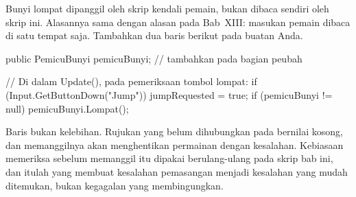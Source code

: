 
Bunyi lompat dipanggil oleh skrip kendali pemain, bukan dibaca sendiri oleh
skrip ini. Alasannya sama dengan alasan pada Bab~XIII: masukan pemain dibaca di
satu tempat saja. Tambahkan dua baris berikut pada 
buatan Anda.

\begin{kodekeluaran}
public PemicuBunyi pemicuBunyi;          // tambahkan pada bagian peubah

// Di dalam Update(), pada pemeriksaan tombol lompat:
if (Input.GetButtonDown("Jump"))
{
    jumpRequested = true;
    if (pemicuBunyi != null) pemicuBunyi.Lompat();
}
\end{kodekeluaran}

\begin{catatabox}
Baris  bukan kelebihan. Rujukan yang belum
dihubungkan pada  bernilai kosong, dan memanggilnya akan
menghentikan permainan dengan kesalahan. Kebiasaan memeriksa sebelum memanggil
itu dipakai berulang-ulang pada skrip bab ini, dan itulah yang membuat
kesalahan pemasangan menjadi kesalahan yang mudah ditemukan, bukan
kegagalan yang membingungkan.
\end{catatabox}
